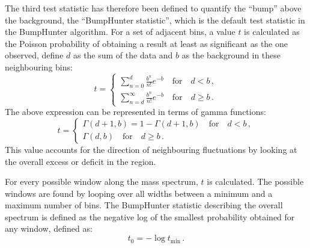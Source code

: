 The third test statistic has therefore been defined to quantify the ``bump'' above the background, the ``BumpHunter statistic'', which is the default test statistic in the BumpHunter algorithm.
For a set of adjacent bins, a value $t$ is calculated as the Poisson probability of obtaining a result at least as significant as the one observed, define $d$ as the sum of the data and $b$ as the background in these neighbouring bins:
\begin{equation}
t =  
\begin{cases}\displaystyle
\sum_{n=0}^{d}\frac{b^{n}}{n!}e^{-b} \quad \mathrm{for} \quad d<b\,, \\\displaystyle
\sum_{n=d}^{\infty}\frac{b^{n}}{n!}e^{-b} \quad \mathrm{for} \quad d \geq b\,.
\end{cases}
\end{equation}
The above expression can be represented in terms of gamma functions:
\begin{equation}
 t =
\begin{cases}\displaystyle
\Gamma(d+1, b) = 1 - \Gamma(d+1, b) \quad \mathrm{for} \quad d<b\,, \\
\Gamma(d, b) \quad \mathrm{for} \quad d \geq b\,.
\end{cases}
\end{equation}
This value accounts for the direction of neighbouring fluctuations by looking at the
overall excess or deficit in the region.

For every possible window along the mass spectrum, $t$ is calculated. The possible windows are found by looping over all widths between a minimum and a maximum number of bins. The BumpHunter statistic describing the overall spectrum is defined as the negative log of the smallest probability obtained for any window, defined as:
\begin{equation}
t_{0} = -\log t_\mathrm{min}\,.
\end{equation}

